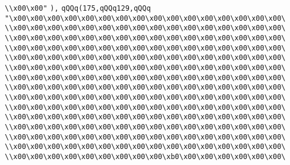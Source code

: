 \verb|\\x00\x00"|\newline
\verb|),|\newline
\verb|qQQq(175,qQQq129,qQQq|\newline
\verb|"\x00\x00\x00\x00\x00\x00\x00\x00\x00\x00\x00\x00\x00\x00\x00\x00\|\newline
\verb|\\x00\x00\x00\x00\x00\x00\x00\x00\x00\x00\x00\x00\x00\x00\x00\x00\|\newline
\verb|\\x00\x00\x00\x00\x00\x00\x00\x00\x00\x00\x00\x00\x00\x00\x00\x00\|\newline
\verb|\\x00\x00\x00\x00\x00\x00\x00\x00\x00\x00\x00\x00\x00\x00\x00\x00\|\newline
\verb|\\x00\x00\x00\x00\x00\x00\x00\x00\x00\x00\x00\x00\x00\x00\x00\x00\|\newline
\verb|\\x00\x00\x00\x00\x00\x00\x00\x00\x00\x00\x00\x00\x00\x00\x00\x00\|\newline
\verb|\\x00\x00\x00\x00\x00\x00\x00\x00\x00\x00\x00\x00\x00\x00\x00\x00\|\newline
\verb|\\x00\x00\x00\x00\x00\x00\x00\x00\x00\x00\x00\x00\x00\x00\x00\x00\|\newline
\verb|\\x00\x00\x00\x00\x00\x00\x00\x00\x00\x00\x00\x00\x00\x00\x00\x00\|\newline
\verb|\\x00\x00\x00\x00\x00\x00\x00\x00\x00\x00\x00\x00\x00\x00\x00\x00\|\newline
\verb|\\x00\x00\x00\x00\x00\x00\x00\x00\x00\x00\x00\x00\x00\x00\x00\x00\|\newline
\verb|\\x00\x00\x00\x00\x00\x00\x00\x00\x00\x00\x00\x00\x00\x00\x00\x00\|\newline
\verb|\\x00\x00\x00\x00\x00\x00\x00\x00\x00\x00\x00\x00\x00\x00\x00\x00\|\newline
\verb|\\x00\x00\x00\x00\x00\x00\x00\x00\x00\x00\x00\x00\x00\x00\x00\x00\|\newline
\verb|\\x00\x00\x00\x00\x00\x00\x00\x00\x00\xb0\x00\x00\x00\x00\x00\x00\|\newline
